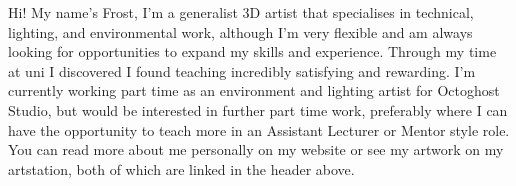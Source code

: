 

\begin{cvparagraph}
    Hi! My name’s Frost, I’m a generalist 3D artist that specialises in technical, lighting, and environmental work, although I’m very flexible and am always looking for opportunities to expand my skills and experience. Through my time at uni I discovered I found teaching incredibly satisfying and rewarding.
    I’m currently working part time as an environment and lighting artist for Octoghost Studio, but would be interested in further part time work, preferably where I can have the opportunity to teach more in an Assistant Lecturer or Mentor style role. You can read more about me personally on my website or see my artwork on my artstation, both of which are linked in the header above.
\end{cvparagraph}



